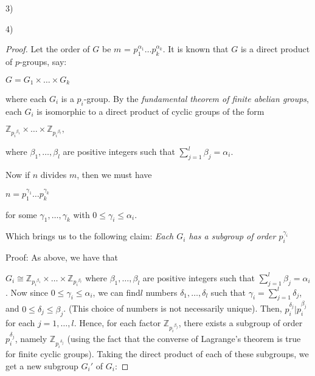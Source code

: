\documentclass[executivepaper]{article}
\begin{document}
\begin{flushleft}

3)

\end{flushleft}

\begin{flushleft}

4)

\begin{proof}

Let the order of $G$ be $m$ = $p_1^{\alpha_1} \ldots p_k^{\alpha_k}$. It is known that $G$ is a direct product of $p$-groups, say:

\begin{center}
 
$G = G_1 \times \ldots \times G_k$

\end{center}

where each $G_i$ is a $p_i$-group. By the \textit{fundamental theorem of finite abelian groups}, each $G_i$ is isomorphic to a direct product of cyclic groups of the form

\begin{center}

$\mathbb{Z}_{{p_i}^{\beta_1}} \times \ldots \times \mathbb{Z}_{{p_i}^{\beta_l}},$

where $\beta_1, \ldots, \beta_l$ are positive integers such that $\sum_{j=1}^l \beta_j = \alpha_i$.

\end{center}

Now if $n$ divides $m$, then we must have

\begin{center}

$n = p_1^{\gamma_1} \ldots p_k^{\gamma_k}$

for some $\gamma_1, \ldots, \gamma_k$ with $0 \leq \gamma_i \leq \alpha_i$.

\end{center}

Which brings us to the following claim: \textit{Each $G_i$ has a subgroup of order $p_i^{\gamma_i}$}

Proof: As above, we have that

$ G_i \cong \mathbb{Z}_{{p_i}^{\beta_1}} \times \ldots \times \mathbb{Z}_{{p_i}^{\beta_l}} $ where $\beta_1, \ldots, \beta_l$ are positive integers such that $\sum_{j=1}^l \beta_j = \alpha_i$. 
Now since $0 \leq \gamma_i \leq \alpha_i$, we can find$l$ numbers $\delta_1, \ldots , \delta_l$ such that $\gamma_i = \sum_{j=1}^l \delta_j$, and $0 \leq \delta_j \leq \beta_j$. (This choice of numbers is not necessarily unique).
Then, $p_i^{\delta_j} | p_i^{\beta_j}$ for each $j = 1, \ldots , l$. Hence, for each factor $\mathbb{Z}_{{p_i}^{\beta_j}}$, there exists a subgroup of order $p_i^{\delta_j}$, namely $\mathbb{Z}_{{p_i}^{\delta_j}}$ (using the fact that the converse of Lagrange's theorem is true for finite cyclic groups). Taking the direct product of each of these subgroups, we get a new subgroup $G_i'$ of $G_i$:


\end{proof}
\end{flushleft}
\end{document}
